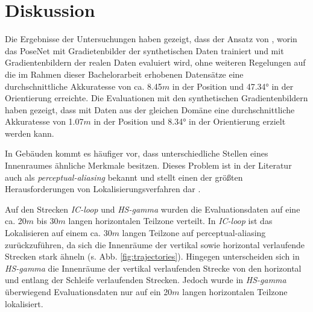 
\section{Diskussion}
\label{sec:kapitel_5}

Die Ergebnisse der Untersuchungen haben gezeigt, dass der Ansatz von \citet{acharyaBIMPoseNetIndoorCamera2019}, worin das PoseNet mit Gradietenbilder der synthetischen Daten trainiert und mit Gradientenbildern der realen Daten evaluiert wird, ohne weiteren Regelungen auf die im Rahmen dieser Bachelorarbeit erhobenen Datensätze eine durchschnittliche Akkuratesse von ca. 8.45$m$ in der Position und 47.34° in der Orientierung erreichte. Die Evaluationen mit den synthetischen Gradientenbildern haben gezeigt, dass mit Daten aus der gleichen Domäne eine durchschnittliche Akkuratesse von 1.07$m$ in der Position und 8.34° in der Orientierung erzielt werden kann. 


In Gebäuden kommt es häufiger vor, dass unterschiedliche Stellen eines Innenraumes ähnliche Merkmale besitzen. Dieses Problem ist in der Literatur auch als \textit{perceptual-aliasing} bekannt und stellt einen der größten Herausforderungen von Lokalisierungsverfahren dar \cite{lowryVisualPlaceRecognition2016}.

Auf den Strecken \textit{IC-loop} und \textit{HS-gamma} wurden die Evaluationsdaten auf eine ca. 20$m$ bis 30$m$ langen horizontalen Teilzone verteilt. In \textit{IC-loop} ist das Lokalisieren auf einem ca. 30$m$ langen Teilzone auf perceptual-aliasing zurückzuführen, da sich die Innenräume der vertikal sowie horizontal verlaufende Strecken stark ähneln (s. Abb. \ref{fig:trajectories}). Hingegen unterscheiden sich in \textit{HS-gamma} die Innenräume der vertikal verlaufenden Strecke von den horizontal und entlang der Schleife verlaufenden Strecken. Jedoch wurde in \textit{HS-gamma} überwiegend Evaluationsdaten nur auf ein 20$m$ langen horizontalen Teilzone lokalisiert.


%



% 




